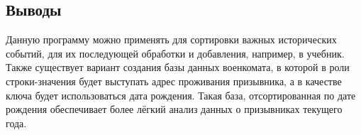 \documentclass[12pt]{article}
\begin{document}
\newpage
\subsection*{Выводы}

Данную программу можно применять для сортировки важных исторических событий, для их последующей обработки и добавления, например, в учебник.\\

Также существует вариант создания базы данных военкомата, в которой в роли строки-значения будет выступать адрес проживания призывника, а в качестве ключа будет использоваться дата рождения. Такая база, отсортированная по дате рождения обеспечивает более лёгкий анализ данных о призывниках текущего года.




\end{document}
